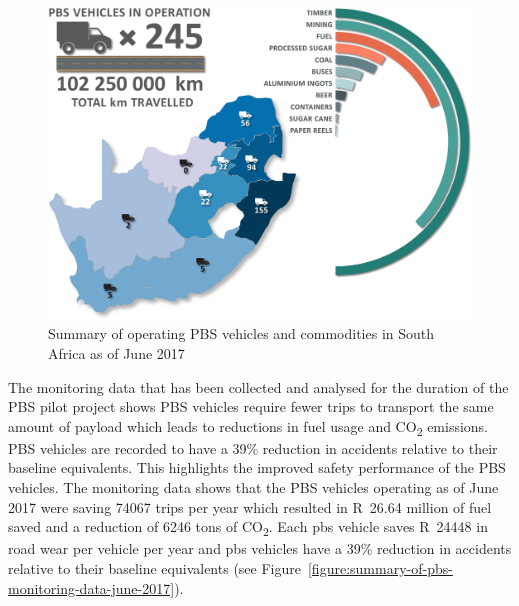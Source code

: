     \begin{figure}[H]
        \centering
        \includegraphics[width=1\textwidth]{fig/pbs-pilot_vehicles-and-commodities-june-2017}
        \caption{Summary of operating PBS vehicles and commodities in South Africa as of June 2017 \cite{Nordengen2018}}
        \label{figure:summary-of-operating-pbs-vehicles-and-commodities-in-south-africa-june-2017}
    \end{figure}

    The monitoring data that has been collected and analysed for the duration of the PBS pilot project shows PBS vehicles require fewer trips to transport the same amount of payload which leads to reductions in fuel usage and CO\textsubscript{2} emissions. PBS vehicles are recorded to have a 39\% reduction in accidents relative to their baseline equivalents. This highlights the improved safety performance of the PBS vehicles. The monitoring data shows that the PBS vehicles operating as of June 2017 were saving 74067 trips per year which resulted in R~26.64 million of fuel saved and a reduction of 6246 tons of CO\textsubscript{2}. Each \gls{pbs} vehicle saves R~24448 in road wear per vehicle per year and \gls{pbs} vehicles have a 39\% reduction in accidents relative to their baseline equivalents (see Figure~\ref{figure:summary-of-pbs-monitoring-data-june-2017}).

